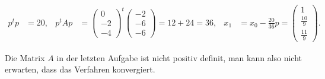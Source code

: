 \begin{loesung}
\begin{teilaufgaben}
\begin{align*}
p^tp&=20,
&
p^tAp&=\begin{pmatrix}0\\-2\\-4\end{pmatrix}^t
\begin{pmatrix} -2\\-6\\-6 \end{pmatrix}
=12+24=36,
&
x_1&=x_0-\frac{20}{36}p
=\begin{pmatrix}
1\\
\frac{10}{9}\\
\frac{11}{9}
\end{pmatrix}.
\end{align*}
\end{teilaufgaben}
\end{loesung}

\begin{diskussion}
Die Matrix $A$ in der letzten Aufgabe ist nicht positiv definit,
man kann also nicht erwarten, dass das Verfahren konvergiert.
\end{diskussion}
